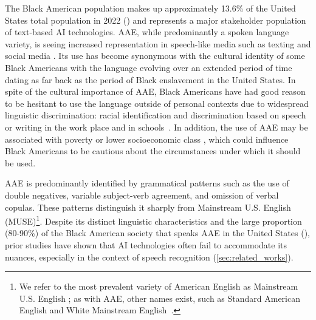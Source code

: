 \noindent
The Black American population makes up approximately 13.6\% of the United States total population in 2022 (\citealp{USCensus2022,Moslimani2023}) and represents a major stakeholder population of text-based AI technologies. 
AAE, while predominantly a spoken language variety, is seeing increased representation in speech-like media such as texting and social media \cite{blodgett2016demographic}. 
Its use has become synonymous with the cultural identity of some Black Americans \cite{BashirAli2006} with the language evolving over an extended period of time dating as far back as the period of Black enslavement in the United States. In spite of the cultural importance of AAE, Black Americans have had good reason to be hesitant to use the language outside of personal contexts due to widespread linguistic discrimination: racial identification and discrimination based on speech or writing in the work place and in schools~\cite{baugh2005linguistic}. In addition, the use of AAE may be associated with poverty or lower socioeconomic class \cite{rickford2015neighborhood}, which could influence Black Americans to be cautious about the circumstances under which it should be used.

AAE is predominantly 
identified by grammatical patterns such as the use of double negatives, variable subject-verb agreement, and omission of verbal copulas. These patterns distinguish it sharply from Mainstream U.S. English (MUSE)\footnote{We refer to the most prevalent variety of American English as Mainstream U.S. English  \cite{baker2020dismantling,harris2022exploring}; as with AAE, other names exist, such as Standard American English and White Mainstream English~\cite{wolfram2015american}.}.   
Despite its distinct linguistic characteristics and the large proportion (80-90\%) of the Black American society that speaks AAE in the United States (\citealp{Holt2018, OQuin2021,Farrington2021}), prior studies have shown that AI technologies often fail to accommodate its nuances, especially in the context of speech recognition (\autoref{sec:related_works}).




